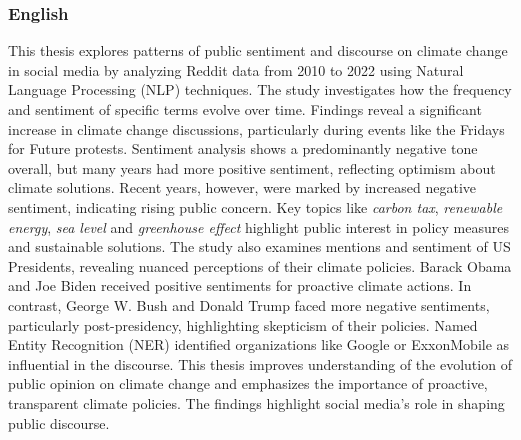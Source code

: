 \subsubsection{English}
This thesis explores patterns of public sentiment and discourse on climate change in social media by analyzing Reddit data from 2010 to 2022 using Natural Language Processing (NLP) techniques. The study investigates how the frequency and sentiment of specific terms evolve over time. Findings reveal a significant increase in climate change discussions, particularly during events like the Fridays for Future protests. Sentiment analysis shows a predominantly negative tone overall, but many years had more positive sentiment, reflecting optimism about climate solutions. Recent years, however, were marked by increased negative sentiment, indicating rising public concern.
Key topics like \emph{carbon tax}, \emph{renewable energy}, \emph{sea level} and \emph{greenhouse effect} highlight public interest in policy measures and sustainable solutions. The study also examines mentions and sentiment of US Presidents, revealing nuanced perceptions of their climate policies. Barack Obama and Joe Biden received positive sentiments for proactive climate actions. In contrast, George W. Bush and Donald Trump faced more negative sentiments, particularly post-presidency, highlighting skepticism of their policies. Named Entity Recognition (NER) identified organizations like Google or ExxonMobile as influential in the discourse.
This thesis improves understanding of the evolution of public opinion on climate change and emphasizes the importance of proactive, transparent climate policies. The findings highlight social media's role in shaping public discourse.


